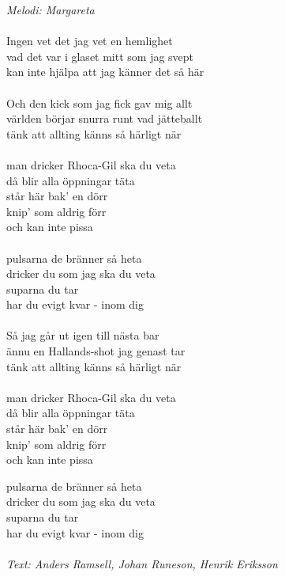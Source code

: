 {\footnotesize\textit{Melodi: Margareta}}\\
\\
Ingen vet det jag vet en hemlighet\\
vad det var i glaset mitt som jag svept\\
kan inte hjälpa att jag känner det så här\\
\\
Och den kick som jag fick gav mig allt\\
världen börjar snurra runt vad jätteballt\\
tänk att allting känns så härligt när\\
\\
man dricker Rhoca-Gil ska du veta \\
då blir alla öppningar täta\\
står här bak' en dörr\\
knip' som aldrig förr\\
och kan inte pissa\\
\\
pulsarna de bränner så heta\\
dricker du som jag ska du veta\\
suparna du tar\\
har du evigt kvar - inom dig\\
\\
Så jag går ut igen till nästa bar\\
ännu en Hallands-shot jag genast tar\\
tänk att allting känns så härligt när\\
\\
man dricker Rhoca-Gil ska du veta \\
då blir alla öppningar täta\\
står här bak' en dörr\\
knip' som aldrig förr\\
och kan inte pissa

pulsarna de bränner så heta\\
dricker du som jag ska du veta\\
suparna du tar \\
har du evigt kvar - inom dig\\
\\
{\footnotesize\textit{Text: Anders Ramsell, Johan Runeson, Henrik Eriksson}}
